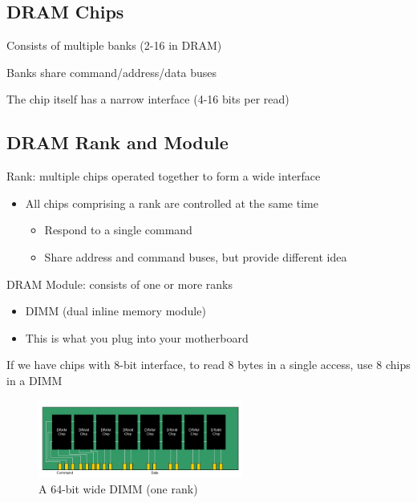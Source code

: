 \documentclass[]{article}
\providecommand{\tightlist}{%
  \setlength{\itemsep}{0pt}\setlength{\parskip}{0pt}}
\begin{document}
\hypertarget{dram-chips}{%
\subsection{DRAM Chips}\label{dram-chips}}

Consists of multiple banks (2-16 in DRAM)

Banks share command/address/data buses

The chip itself has a narrow interface (4-16 bits per read)

\hypertarget{dram-rank-and-module}{%
\subsection{DRAM Rank and Module}\label{dram-rank-and-module}}

Rank: multiple chips operated together to form a wide interface

\begin{itemize}
\tightlist
\item
  All chips comprising a rank are controlled at the same time

  \begin{itemize}
  \tightlist
  \item
    Respond to a single command
  \item
    Share address and command buses, but provide different idea
  \end{itemize}
\end{itemize}

DRAM Module: consists of one or more ranks

\begin{itemize}
\tightlist
\item
  DIMM (dual inline memory module)
\item
  This is what you plug into your motherboard
\end{itemize}

If we have chips with 8-bit interface, to read 8 bytes in a single
access, use 8 chips in a DIMM

\begin{figure}
\centering
\includegraphics[width=0.6\textwidth,height=\textheight]{./tex2pdf.-ee748c56ff17e1e1/beea6dee16691a185c8dfbb616aa9effabce9a48.png}
\caption{A 64-bit wide DIMM (one rank)}
\end{figure}
\end{document}
